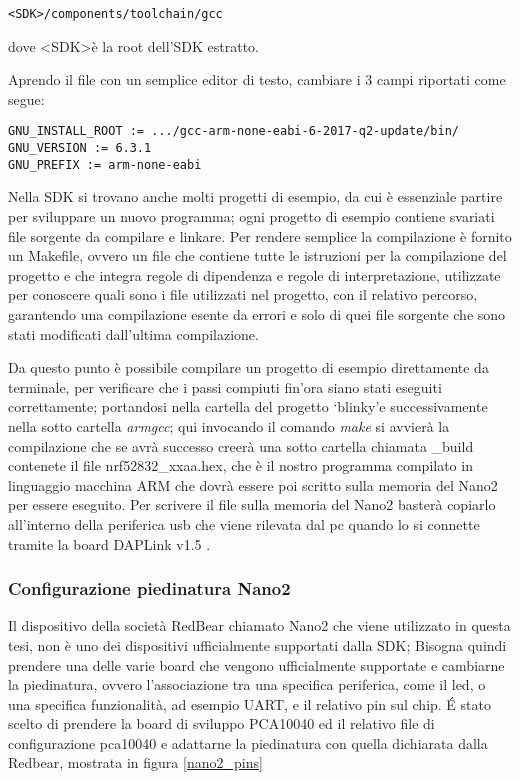 \begin{verbatim}
<SDK>/components/toolchain/gcc
\end{verbatim}
dove \textless SDK\textgreater  è la root dell'SDK estratto.

Aprendo il file con un semplice editor di testo, cambiare i 3 campi riportati come segue:

\begin{verbatim}
GNU_INSTALL_ROOT := .../gcc-arm-none-eabi-6-2017-q2-update/bin/
GNU_VERSION := 6.3.1
GNU_PREFIX := arm-none-eabi
\end{verbatim}

Nella SDK si trovano anche molti progetti di esempio, da cui è essenziale partire per sviluppare un nuovo programma; ogni progetto di esempio contiene svariati file sorgente da compilare e linkare. Per rendere semplice la compilazione è fornito un Makefile, ovvero un file che contiene tutte le istruzioni per la compilazione del progetto e che integra regole di dipendenza e regole di interpretazione, utilizzate per conoscere quali sono i file utilizzati nel progetto, con il relativo percorso, garantendo una compilazione esente da errori e solo di quei file sorgente che sono stati modificati dall'ultima compilazione.

Da questo punto è possibile compilare un progetto di esempio direttamente da terminale, per verificare che i passi compiuti fin'ora siano stati eseguiti correttamente; portandosi nella cartella del progetto \lq blinky\rq e successivamente nella sotto cartella \emph{armgcc}; qui invocando il comando \emph{make} si avvierà la compilazione che se avrà successo creerà una sotto cartella chiamata \_build contenete il file nrf52832\_xxaa.hex, che è il nostro programma compilato in linguaggio macchina ARM che dovrà essere poi scritto sulla memoria del Nano2 per essere eseguito.
Per scrivere il file sulla memoria del Nano2 basterà copiarlo all'interno della periferica usb che viene rilevata dal pc quando lo si connette tramite la board DAPLink v1.5 .
\subsubsection{Configurazione piedinatura Nano2}
Il dispositivo della società RedBear chiamato Nano2 che viene utilizzato in questa tesi, non è uno dei dispositivi ufficialmente supportati dalla SDK; Bisogna quindi prendere una delle varie board che vengono ufficialmente supportate e cambiarne la piedinatura, ovvero l'associazione tra una specifica periferica, come il led, o una specifica funzionalità, ad esempio UART, e il relativo pin sul chip. 
\'E stato scelto di prendere la board di sviluppo PCA10040 ed il relativo file di configurazione pca10040 e adattarne la piedinatura con quella dichiarata dalla Redbear, mostrata in figura \ref{nano2_pins}

